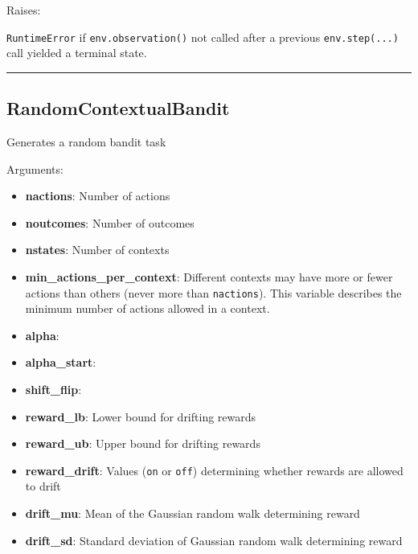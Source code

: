 Raises:

\texttt{RuntimeError} if \texttt{env.observation()} not called after a
previous \texttt{env.step(...)} call yielded a terminal state.

\begin{center}\rule{0.5\linewidth}{\linethickness}\end{center}

\subsection{RandomContextualBandit}\label{randomcontextualbandit}

\begin{Shaded}
\begin{Highlighting}[]
\end{Highlighting}
\end{Shaded}

Generates a random bandit task

Arguments:

\begin{itemize}
\tightlist
\item
  \textbf{nactions}: Number of actions
\item
  \textbf{noutcomes}: Number of outcomes
\item
  \textbf{nstates}: Number of contexts
\item
  \textbf{min\_actions\_per\_context}: Different contexts may have more
  or fewer actions than others (never more than \texttt{nactions}). This
  variable describes the minimum number of actions allowed in a context.
\item
  \textbf{alpha}:
\item
  \textbf{alpha\_start}:
\item
  \textbf{shift\_flip}:
\item
  \textbf{reward\_lb}: Lower bound for drifting rewards
\item
  \textbf{reward\_ub}: Upper bound for drifting rewards
\item
  \textbf{reward\_drift}: Values (\texttt{on} or \texttt{off})
  determining whether rewards are allowed to drift
\item
  \textbf{drift\_mu}: Mean of the Gaussian random walk determining
  reward
\item
  \textbf{drift\_sd}: Standard deviation of Gaussian random walk
  determining reward
\end{itemize}

